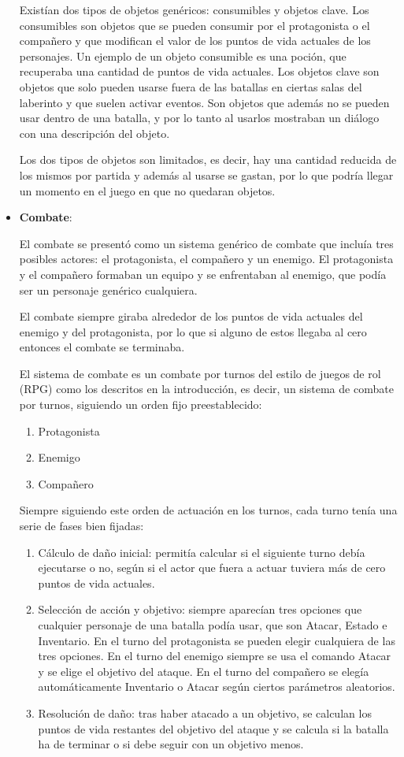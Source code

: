 \begin{itemize}
	Existían dos tipos de objetos genéricos: consumibles y objetos clave. 
	Los consumibles son objetos que se pueden consumir por el protagonista o el compañero y que modifican el valor de los puntos de vida actuales de los personajes. Un ejemplo de un objeto consumible es una poción, que recuperaba una cantidad de puntos de vida actuales.
	Los objetos clave son objetos que solo pueden usarse fuera de las batallas en ciertas salas del laberinto y que suelen activar eventos. Son objetos que además no se pueden usar dentro de una batalla, y por lo tanto al usarlos mostraban un diálogo con una descripción del objeto.
	
	Los dos tipos de objetos son limitados, es decir, hay una cantidad reducida de los mismos por partida y además al usarse se gastan, por lo que podría llegar un momento en el juego en que no quedaran objetos.
	
	\item \textbf{Combate}:
	
	El combate se presentó como un sistema genérico de combate que incluía tres posibles actores: el protagonista, el compañero y un enemigo. El protagonista y el compañero formaban un equipo y se enfrentaban al enemigo, que podía ser un personaje genérico cualquiera.
	
	El combate siempre giraba alrededor de los puntos de vida actuales del enemigo y del protagonista, por lo que si alguno de estos llegaba al cero entonces el combate se terminaba.
	
	El sistema de combate es un combate por turnos del estilo de juegos de rol (RPG) como los descritos en la introducción, es decir, un sistema de combate por turnos, siguiendo un orden fijo preestablecido:
	\begin{enumerate}
		\item Protagonista
		\item Enemigo
		\item Compañero
	\end{enumerate} 
	
	Siempre siguiendo este orden de actuación en los turnos, cada turno tenía una serie de fases bien fijadas:
	\begin{enumerate}
		\item Cálculo de daño inicial: permitía calcular si el siguiente turno debía ejecutarse o no, según si el actor que fuera a actuar tuviera más de cero puntos de vida actuales.
		\item Selección de acción y objetivo: siempre aparecían tres opciones que cualquier personaje de una batalla podía usar, que son Atacar, Estado e Inventario.
		En el turno del protagonista se pueden elegir cualquiera de las tres opciones. En el turno del enemigo siempre se usa el comando Atacar y se elige el objetivo del ataque. En el turno del compañero se elegía automáticamente Inventario o Atacar según ciertos parámetros aleatorios.
		\item Resolución de daño: tras haber atacado a un objetivo, se calculan los puntos de vida restantes del objetivo del ataque y se calcula si la batalla ha de terminar o si debe seguir con un objetivo menos.
	\end{enumerate} 
	

\end{itemize}
